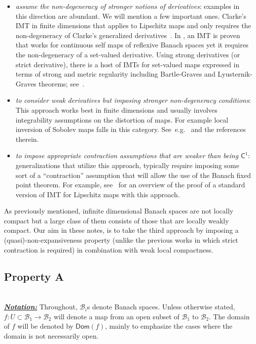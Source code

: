\documentclass[a4, 12pt,leqno]{amsart}
\newcounter{example}
\theoremstyle{plain}
\theoremstyle{definition}
\theoremstyle{remark}
\numberwithin{equation}{section}
\newcommand{\B}{\mathcal{B}}
\begin{document}
\begin{itemize}
	\item \textsl{assume the non-degeneracy of stronger notions of derivatives}: examples in this direction are abundant. We will mention a few important ones. Clarke's IMT in finite dimensions that applies to Lipschitz maps and only requires the non-degeneracy of Clarke's generalized derivatives~\cite{Clarke}. In \cite{Feckan}, an IMT is proven that works for continuous self maps of reflexive Banach spaces yet it requires the non-degeneracy of a set-valued derivative. Using strong derivatives (or strict derivative), there is a host of IMTs for set-valued maps expressed in terms of strong and metric regularity including Bartle-Graves and Lyusternik-Graves theorems; see~\cite{Dontchev}.
	\item \textsl{to consider weak derivatives but imposing stronger non-degeneracy conditions}: This approach works best in finite dimensions and usually involves integrability assumptions on the distortion of maps. For example local inversion of Sobolev maps falls in this category. See~e.g.~\cite{FG,HK} and the references therein.  
	\item \textsl{to impose appropriate contraction assumptions that are weaker than being $\mathsf{C}^1$}: generalizations that utilize this approach, typically require imposing some sort of a ``contraction'' assumption that will allow the use of the Banach fixed point theorem. For example, see~\cite{Howard} for an overview of the proof of a standard version of IMT for Lipschitz maps with this approach.
\end{itemize}
\par As previously mentioned, infinite dimensional Banach spaces are not locally compact but a large class of them consists of those that are locally weakly compact. Our aim in these notes, is to take the third approach by imposing a (quasi)-non-expansiveness property (unlike the previous works in which strict contraction is required) in combination with weak local compactness. 
\subsection{Property A}
\hfill\\
\noindent\underline{\small \emph{\textbf{Notation:}}} Throughout, $\B_i$s denote Banach spaces. Unless otherwise stated, $f: U \subset \B_1 \to \B_2$ will denote a map from an open subset of $\B_1$ to $\B_2$. The domain of $f$ will be denoted by $\mathsf{Dom}(f)$, mainly to emphasize the cases where the domain is not necessarily open.
\end{document}
